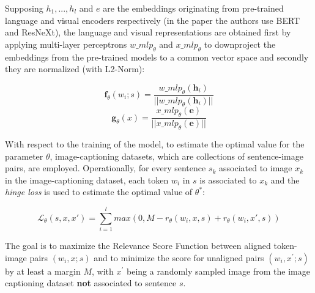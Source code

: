 \documentclass[
]{krantz}
\begin{document}
Supposing \(h_1,...,h_l\) and \(e\) are the embeddings originating from pre-trained language and visual encoders respectively (in the paper the authors use BERT and ResNeXt), the language and visual representations are obtained first by applying multi-layer perceptrons \(w\_mlp_{\theta}\) and \(x\_mlp_{\theta}\) to downproject the embeddings from the pre-trained models to a common vector space and secondly they are normalized (with L2-Norm):

\[ \textbf{f}_{\theta}(w_{i};s)= \frac{w{\_}mlp_{\theta}(\textbf{h}_{i})}{||w{\_}mlp_{\theta}(\textbf{h}_{i})||} \]
\[ \textbf{g}_{\theta}(x)= \frac{x{\_}mlp_{\theta}(\textbf{e})}{||x{\_}mlp_{\theta}(\textbf{e})||} \]

With respect to the training of the model, to estimate the optimal value for the parameter \(\theta\), image-captioning datasets, which are collections of sentence-image pairs, are employed. Operationally, for every sentence \(s_k\) associated to image \(x_k\) in the image-captioning dataset, each token \(w_i\) in \(s\) is associated to \(x_k\) and the \emph{hinge loss} is used to estimate the optimal value of \(\theta^*\):

\[ \mathcal{L}_{\theta}(s,x,x')=\sum_{i=1}^{l}max(0,M-r_{\theta}(w_{i},x,s)+r_{\theta}(w_{i},x',s))\]

The goal is to maximize the Relevance Score Function between aligned token-image pairs \((w_i,x;s)\) and to minimize the score for unaligned pairs \((w_i,x^{'};s)\) by at least a margin \(M\), with \(x^{'}\) being a randomly sampled image from the image captioning dataset \textbf{not} associated to sentence \(s\).
\end{document}
